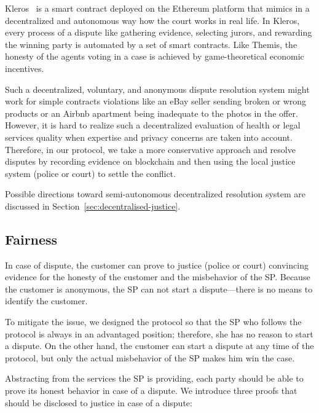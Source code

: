 Kleros~\cite{bergollaKlerosSociolegalCase2022} is a smart contract deployed on the Ethereum platform that mimics in a decentralized and autonomous way how the court works in real life. In Kleros, every process of a dispute like gathering evidence, selecting jurors, and rewarding the winning party is automated by a set of smart contracts. Like Themis, the honesty of the agents voting in a case is achieved by game-theoretical economic incentives.

Such a decentralized, voluntary, and anonymous dispute resolution system might work for simple contracts violations like an eBay seller sending broken or wrong products or an Airbnb apartment being inadequate to the photos in the offer. However, it is hard to realize such a decentralized evaluation of health or legal services quality when expertise and privacy concerns are taken into account. Therefore, in our protocol, we take a more conservative approach and resolve disputes by recording evidence on blockchain and then using the local justice system (police or court) to settle the conflict.

Possible directions toward semi-autonomous decentralized resolution system are discussed in Section~\ref{sec:decentralised-justice}.

\subsection{Fairness}\label{fairness}

In case of dispute, the customer can prove to justice (police or court) convincing evidence for the honesty of the customer and the misbehavior of the SP. 
Because the customer is anonymous, the SP can not start a dispute---there is no means to identify the customer.

To mitigate the issue, we designed the protocol so that the SP who follows the protocol is always in an advantaged position; therefore, she has no reason to start a dispute. On the other hand, the customer can start a dispute at any time of the protocol, but only the actual misbehavior of the SP makes him win the case.

Abstracting from the services the SP is providing, each party should be able to prove its honest behavior in case of a dispute. We introduce three proofs that should be disclosed to justice in case of a dispute:

